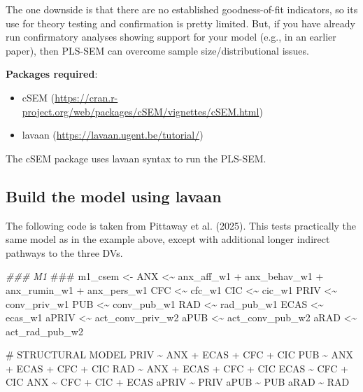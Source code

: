 \documentclass[
  letterpaper,
  DIV=11,
  numbers=noendperiod]{scrreprt}
\newenvironment{Shaded}{\begin{snugshade}}{\end{snugshade}}
\newcommand{\AlertTok}[1]{\textcolor[rgb]{0.68,0.00,0.00}{#1}}
\newcommand{\DocumentationTok}[1]{\textcolor[rgb]{0.37,0.37,0.37}{\textit{#1}}}
\newcommand{\NormalTok}[1]{\textcolor[rgb]{0.00,0.23,0.31}{#1}}
\newcommand{\OtherTok}[1]{\textcolor[rgb]{0.00,0.23,0.31}{#1}}
\newcommand{\StringTok}[1]{\textcolor[rgb]{0.13,0.47,0.30}{#1}}
\begin{document}
The one downside is that there are no established goodness-of-fit
indicators, so its use for theory testing and confirmation is pretty
limited. But, if you have already run confirmatory analyses showing
support for your model (e.g., in an earlier paper), then PLS-SEM can
overcome sample size/distributional issues.

\textbf{Packages required}:

\begin{itemize}
\item
  cSEM
  (\url{https://cran.r-project.org/web/packages/cSEM/vignettes/cSEM.html})
\item
  lavaan (\url{https://lavaan.ugent.be/tutorial/})
\end{itemize}

The cSEM package uses lavaan syntax to run the PLS-SEM.

\subsection{Build the model using
lavaan}\label{build-the-model-using-lavaan}

The following code is taken from Pittaway et al. (2025). This tests
practically the same model as in the example above, except with
additional longer indirect pathways to the three DVs.

\begin{Shaded}
\begin{Highlighting}[]
\DocumentationTok{\#\#\# M1 }\AlertTok{\#\#\#}
\NormalTok{m1\_csem }\OtherTok{\textless{}{-}} \StringTok{\textquotesingle{}}
\StringTok{ANX \textless{}\textasciitilde{} anx\_aff\_w1 + anx\_behav\_w1 + anx\_rumin\_w1 + anx\_pers\_w1}
\StringTok{CFC \textless{}\textasciitilde{} cfc\_w1}
\StringTok{CIC \textless{}\textasciitilde{} cic\_w1}
\StringTok{PRIV \textless{}\textasciitilde{} conv\_priv\_w1}
\StringTok{PUB \textless{}\textasciitilde{} conv\_pub\_w1}
\StringTok{RAD \textless{}\textasciitilde{} rad\_pub\_w1}
\StringTok{ECAS \textless{}\textasciitilde{} ecas\_w1}
\StringTok{aPRIV \textless{}\textasciitilde{} act\_conv\_priv\_w2}
\StringTok{aPUB \textless{}\textasciitilde{} act\_conv\_pub\_w2}
\StringTok{aRAD \textless{}\textasciitilde{} act\_rad\_pub\_w2}

\StringTok{\# STRUCTURAL MODEL }
\StringTok{PRIV \textasciitilde{} ANX + ECAS + CFC + CIC}
\StringTok{PUB \textasciitilde{} ANX + ECAS + CFC + CIC}
\StringTok{RAD \textasciitilde{} ANX + ECAS + CFC + CIC}
\StringTok{ECAS \textasciitilde{} CFC + CIC}
\StringTok{ANX \textasciitilde{} CFC + CIC + ECAS}
\StringTok{aPRIV \textasciitilde{} PRIV}
\StringTok{aPUB \textasciitilde{} PUB}
\StringTok{aRAD \textasciitilde{} RAD}
\StringTok{\textquotesingle{}}
\end{Highlighting}
\end{Shaded}
\end{document}
